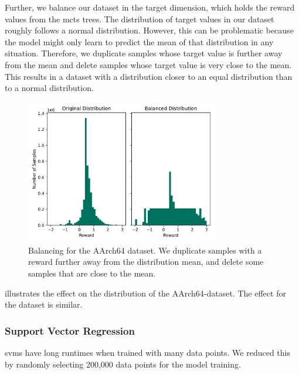 Further, we balance our dataset in the target dimension, which holds the reward values from the \ac{mcts} trees.
The distribution of target values in our dataset roughly follows a normal distribution.
However, this can be problematic because the model might only learn to predict the mean of that distribution in any situation.
Therefore, we duplicate samples whose target value is further away from the mean and delete samples whose target value is very close to the mean.
This results in a dataset with a distribution closer to an equal distribution than to a normal distribution.
\begin{figure}
    \centering
    \includegraphics[width=0.75\textwidth]{img/balanced-supervised-dataset-rpi.pdf}
    \caption[Balancing for the AArch64 Dataset]{Balancing for the AArch64 dataset. 
    We duplicate samples with a reward further away from the distribution mean, and delete some samples that are close to the mean.}
    \label{fig:eval:balanced-dataset}
\end{figure}
 illustrates the effect on the distribution of the AArch64-dataset.
The effect for the \aurora dataset is similar.

\subsubsection{Support Vector Regression}
\label{sec:eval:svm}
\acp{svm} have long runtimes when trained with many data points.
We reduced this by randomly selecting 200,000 data points for the model training.

